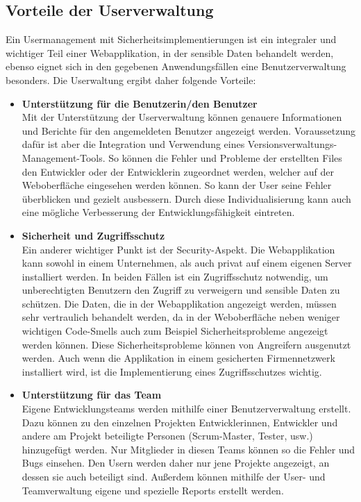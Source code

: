 \subsection{Vorteile der Userverwaltung}
Ein Usermanagement mit Sicherheitsimplementierungen ist ein integraler und wichtiger Teil einer Webapplikation, in der sensible Daten behandelt werden, ebenso eignet sich in den gegebenen Anwendungsfällen eine Benutzerverwaltung besonders. Die Userwaltung ergibt daher folgende Vorteile:
\begin{itemize} 
  \item \textbf{Unterstützung für die Benutzerin/den Benutzer}  \\
Mit der Unterstützung der Userverwaltung können genauere Informationen und Berichte für den angemeldeten Benutzer angezeigt werden. Voraussetzung dafür ist aber die Integration und Verwendung eines Versionsverwaltungs-Management-Tools. So können die Fehler und Probleme der erstellten Files den Entwickler oder der Entwicklerin zugeordnet werden, welcher auf der Weboberfläche eingesehen werden können. So kann der User seine Fehler überblicken und gezielt ausbessern. Durch diese Individualisierung kann auch eine mögliche Verbesserung der Entwicklungsfähigkeit eintreten.  
    \item \textbf{Sicherheit und Zugriffsschutz} \\ Ein anderer wichtiger Punkt ist der Security-Aspekt. Die Webapplikation kann sowohl in einem Unternehmen, als auch privat auf einem eigenen Server installiert werden. In beiden Fällen ist ein Zugriffsschutz notwendig, um unberechtigten Benutzern den Zugriff zu verweigern und sensible Daten zu schützen. Die Daten, die in der Webapplikation angezeigt werden, müssen sehr vertraulich behandelt werden, da in der Weboberfläche neben weniger wichtigen Code-Smells auch zum Beispiel Sicherheitsprobleme angezeigt werden können. Diese Sicherheitsprobleme können von Angreifern ausgenutzt werden. Auch wenn die Applikation in einem gesicherten Firmennetzwerk installiert wird, ist die Implementierung eines Zugriffsschutzes wichtig. 
\item \textbf{Unterstützung für das Team} \\
Eigene Entwicklungsteams werden mithilfe einer Benutzerverwaltung erstellt. Dazu können zu den einzelnen Projekten Entwicklerinnen, Entwickler und andere am Projekt beteiligte Personen (Scrum-Master, Tester, usw.) hinzugefügt werden. Nur Mitglieder in diesen Teams können so die Fehler und Bugs einsehen. Den Usern werden daher nur jene Projekte angezeigt, an dessen sie auch beteiligt sind. Außerdem können mithilfe der User- und Teamverwaltung eigene und spezielle Reports erstellt werden.
\end{itemize}

